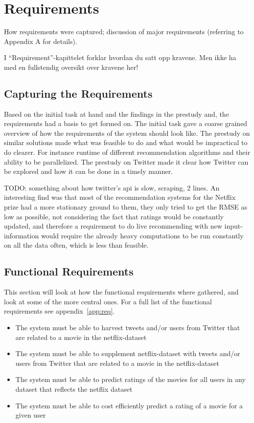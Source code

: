 
\chapter{Requirements}

\minitoc

How requirements  were  captured;
  discussion  of  major requirements
(referring  to  Appendix  A for details).

I “Requirement”-kapittelet forklar hvordan du satt opp kravene.
Men ikke ha med en fullstendig oversikt over kravene her!


\clearpage

\section{Capturing the Requirements}
Based on the initial task at hand and the findings in the prestudy and, the requirements had a basis to get formed on. The initial task gave a coarse grained overview of how the requirements of the system should look like. The prestudy on similar solutions made what was feasible to do and what would be impractical to do clearer. For instance runtime of different recommendation algorithms and their ability to be parallelized. The prestudy on Twitter made it clear how Twitter can be explored and how it can be done in a timely manner.

TODO: something about how twitter's api is slow, scraping, 2 lines.
An interesting find was that most of the recommendation systems for the Netflix prize had a more stationary ground to them, they only tried to get the RMSE as low as possible, not considering the fact that ratings would be constantly updated, and therefore a requirement to do live recommending with new input-information would require the already heavy computations to be run constantly on all the data often, which is less than feasible.


\section{Functional Requirements}\label{section:functional-requirements}
This section will look at how the functional requirements where gathered, and look at some of the more central ones. For a full list of the functional requirements see appendix~\ref{app:req}.
\begin{itemize}
  \item The system must be able to harvest tweets and/or users from Twitter that are related to a movie in the netflix-dataset
  \item The system must be able to supplement netflix-dataset with tweets and/or users from Twitter that are related to a movie in the netflix-dataset
  \item The system must be able to predict ratings of the movies for all users in any dataset that reflects the netflix dataset
  \item The system must be able to cost efficiently predict a rating of a movie for a given user
\end{itemize}


